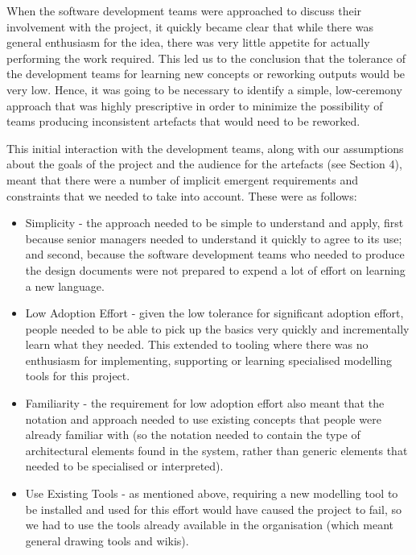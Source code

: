   When the software development teams were approached to discuss their involvement with the project, it quickly became clear that while there was general enthusiasm for the idea, there was very little appetite for actually performing the work required.  This led us to the conclusion that the tolerance of the development teams for learning new concepts or reworking outputs would be very low.  Hence, it was going to be necessary to identify a simple, low-ceremony approach that was highly prescriptive in order to minimize the possibility of teams producing inconsistent artefacts that would need to be reworked.

  This initial interaction with the development teams, along with our assumptions about the goals of the project and the audience for the artefacts (see Section 4), meant that there were a number of implicit emergent requirements and constraints that we needed to take into account.  These were as follows:

  \begin{itemize}

\item Simplicity - the approach needed to be simple to understand and apply, first because senior managers needed to understand it quickly to agree to its use; and second, because the software development teams who needed to produce the design documents were not prepared to expend a lot of effort on learning a new language.

\item Low Adoption Effort - given the low tolerance for significant adoption effort, people needed to be able to pick up the basics very quickly and incrementally learn what they needed.  This extended to tooling where there was no enthusiasm for implementing, supporting or learning specialised modelling tools for this project.

\item Familiarity - the requirement for low adoption effort also meant that the notation and approach needed to use existing concepts that people were already familiar with (so the notation needed to contain the type of architectural elements found in the system, rather than generic elements that needed to be specialised or interpreted).

\item Use Existing Tools - as mentioned above, requiring a new modelling tool to be installed and used for this effort would have caused the project to fail, so we had to use the tools already available in the organisation (which meant general drawing tools and wikis).

  \end{itemize}


